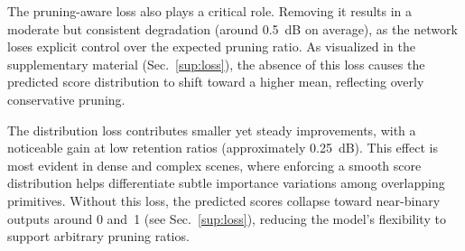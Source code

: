 The pruning-aware loss also plays a critical role. 
Removing it results in a moderate but consistent degradation (around 0.5~dB on average), as the network loses explicit control over the expected pruning ratio. 
As visualized in the supplementary material (Sec.~\ref{sup:loss}), the absence of this loss causes the predicted score distribution to shift toward a higher mean, reflecting overly conservative pruning.

The distribution loss contributes smaller yet steady improvements, with a noticeable gain at low retention ratios (approximately 0.25~dB). 
This effect is most evident in dense and complex scenes, where enforcing a smooth score distribution helps differentiate subtle importance variations among overlapping primitives. 
Without this loss, the predicted scores collapse toward near-binary outputs around 0 and~1 (see Sec.~\ref{sup:loss}), reducing the model's flexibility to support arbitrary pruning ratios.

